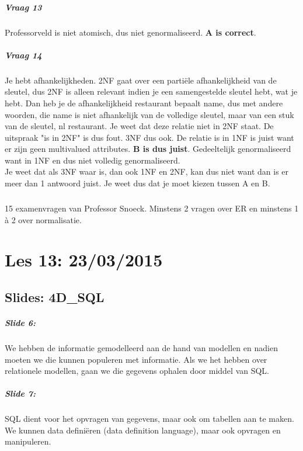 \documentclass[10pt,a4paper]{report}
\begin{document}
\paragraph{Vraag 13}Professorveld is niet atomisch, dus niet genormaliseerd. \textbf{A is correct}.

\paragraph{Vraag 14}Je hebt afhankelijkheden. 2NF gaat over een partiële afhankelijkheid van de sleutel, dus 2NF is alleen relevant indien je een samengestelde sleutel hebt, wat je hebt. Dan heb je de afhankelijkheid restaurant bepaalt name, dus met andere woorden, die name is niet afhankelijk van de volledige sleutel, maar van een stuk van de sleutel, nl restaurant. Je weet dat deze relatie niet in 2NF staat. De uitspraak "is in 2NF" is dus fout. 3NF dus ook. De relatie is in 1NF is juist want er zijn geen multivalued attributes.\textbf{ B is dus juist}. Gedeeltelijk genormaliseerd want in 1NF en dus niet volledig genormaliseerd.\\
Je weet dat als 3NF waar is, dan ook 1NF en 2NF, kan dus niet want dan is er meer dan 1 antwoord juist. Je weet dus dat je moet kiezen tussen A en B.

\paragraph{}
15 examenvragen van Professor Snoeck. Minstens 2 vragen over ER en minstens 1 \`a 2 over normalisatie.

\chapter{Les 13: 23/03/2015}
\section{Slides: 4D\_SQL}

\paragraph{Slide 6:}We hebben de informatie gemodelleerd aan de hand van modellen en nadien moeten we die kunnen populeren met informatie. Als we het hebben over relationele modellen, gaan we die gegevens ophalen door middel van SQL.

\paragraph{Slide 7:}SQL dient voor het opvragen van gegevens, maar ook om tabellen aan te maken. We kunnen data definiëren (data definition language), maar ook opvragen en manipuleren.
\end{document}
